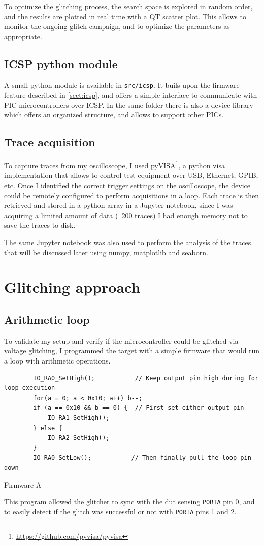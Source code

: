 \documentclass[a4paper,english,twoside,10pt]{article}
\begin{document}
To optimize the glitching process, the search space is explored in random order, and the results are plotted in real time with a QT scatter plot. This allows to monitor the ongoing glitch campaign, and to optimize the parameters as appropriate.

\subsection{ICSP python module}
A small python module is available in \texttt{src/icsp}. It buils upon the firmware feature described in \ref{sect:icsp}, and offers a simple interface to communicate with PIC microcontrollers over ICSP. In the same folder there is also a device library which offers an organized structure, and allows to support other PICs.

\subsection{Trace acquisition}\label{sect:traceacquisition}
To capture traces from my oscilloscope, I used pyVISA\footnote{\url{https://github.com/pyvisa/pyvisa}}, a python \gls{visa} implementation that allows to control test equipment over USB, Ethernet, GPIB, etc. Once I identified the correct trigger settings on the oscilloscope, the device could be remotely configured to perform acquisitions in a loop. Each trace is then retrieved and stored in a python array in a Jupyter notebook, since I was acquiring a limited amount of data (~200 traces) I had enough memory not to save the traces to disk.

The same Jupyter notebook was also used to perform the analysis of the traces that will be discussed later using numpy, matplotlib and seaborn.


\section{Glitching approach}\label{sect:approach}
\subsection{Arithmetic loop}\label{sect:arithmeticloop}
To validate my setup and verify if the microcontroller could be glitched via voltage glitching, I programmed the target with a simple firmware that would run a loop with arithmetic operations.
%
\begin{flushleft}
	\captionsetup{type=listing}
	\begin{verbatim}
		IO_RA0_SetHigh();           // Keep output pin high during for loop execution
		for(a = 0; a < 0x10; a++) b--;
		if (a == 0x10 && b == 0) {  // First set either output pin
			IO_RA1_SetHigh();
		} else {
			IO_RA2_SetHigh();
		}
		IO_RA0_SetLow();           // Then finally pull the loop pin down
	\end{verbatim}
	\caption{Firmware A}
\end{flushleft}
%
This program allowed the glitcher to sync with the \gls{dut} sensing \texttt{PORTA} pin 0, and to easily detect if the glitch was successful or not with \texttt{PORTA} pins 1 and 2.
\end{document}
